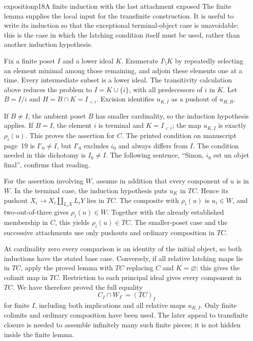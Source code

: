 \begin{dcomment}{exposition}{p18}{A finite induction with the last attachment exposed}
The finite lemma supplies the local input for the transfinite construction. It is useful to write its induction so that the exceptional terminal-object case is unavoidable: this is the case in which the latching condition itself must be used, rather than another induction hypothesis.

Fix a finite poset $I$ and a lower ideal $K$. Enumerate $I\setminus K$ by repeatedly selecting an element minimal among those remaining, and adjoin these elements one at a time. Every intermediate subset is a lower ideal. The transitivity calculation above reduces the problem to $I=K\cup\{i\}$, with all predecessors of $i$ in $K$. Let $B=I/i$ and $H=B\cap K=I_{<i}$. Excision identifies $u_{K,I}$ as a pushout of $u_{H,B}$.

If $B\ne I$, the ambient poset $B$ has smaller cardinality, so the induction hypothesis applies. If $B=I$, the element $i$ is terminal and $K=I_{<i}$; the map $u_{K,I}$ is exactly $\rho_i(u)$. This proves the assertion for $C$. The printed condition on manuscript page~19 is $I'_0\ne I$, but $I'_0$ excludes $i_0$ and always differs from $I$. The condition needed in this dichotomy is $I_0\ne I$. The following sentence, ``Sinon, $i_0$ est un objet final'', confirms that reading.

For the assertion involving $W$, assume in addition that every component of $u$ is in $W$. In the terminal case, the induction hypothesis puts $u_K$ in $TC$. Hence its pushout $X_i\to X_i\amalg_{L_iX}L_iY$ lies in $TC$. The composite with $\rho_i(u)$ is $u_i\in W$, and two-out-of-three gives $\rho_i(u)\in W$. Together with the already established membership in $C$, this yields $\rho_i(u)\in TC$. The smaller-poset case and the successive attachments use only pushouts and ordinary composition in $TC$.

At cardinality zero every comparison is an identity of the initial object, so both inductions have the stated base case. Conversely, if all relative latching maps lie in $TC$, apply the proved lemma with $TC$ replacing $C$ and $K=\varnothing$; this gives the colimit map in $TC$. Restriction to each principal ideal gives every component in $TC$. We have therefore proved the full equality
\[
 C_I\cap W_{I^\circ}=(TC)_I
\]
for finite $I$, including both implications and all relative maps $u_{K,I}$. Only finite colimits and ordinary composition have been used. The later appeal to transfinite closure is needed to assemble infinitely many such finite pieces; it is not hidden inside the finite lemma.
\end{dcomment}

